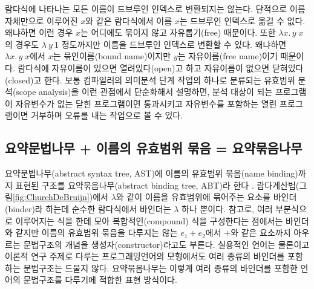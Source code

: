 람다식에 나타나는 모든 이름이 드브루인 인덱스로 변환되지는 않는다.
단적으로 이름 자체만으로 이루어진 $x$와 같은 람다식에서 이름 $x$는
드브루인 인덱스로 옮길 수 없다. 왜냐하면 이런 경우 $x$는 어디에도 묶이지
않고 자유롭기(free) 때문이다. 또한 $\lambda x.\,y\;x$의 경우도 
$\lambda~y~1$ 정도까지만 이름을 드브루인 인덱스로 변환할 수 있다.
왜냐하면 $\lambda x.\,y\;x$에서 $x$는
%
%
묶인이름(bound name)이지만
$y$는
%
%
자유이름(free name)이기 때문이다. 람다식에 자유이름이 있으면
열려있다(open)고 하고 자유이름이 없으면 닫혀있다(closed)고 한다.
보통 컴파일러의 의미분석 단계 작업의 하나로 분류되는
%
%
유효범위 분석(scope analysis)을 이런 관점에서 단순화해서 설명하면,
분석 대상이 되는 프로그램이 자유변수가 없는 닫힌 프로그램이면 통과시키고
자유변수를 포함하는 열린 프로그램이면 거부하며 오류를 내는 작업으로 볼 수 있다.

\subsection{요약문법나무 + 이름의 유효범위 묶음 = 요약묶음나무}
%
%
%
요약문법나무(abstract syntax tree, AST)에
이름의 유효범위 묶음(name binding)까지 표현된 구조를
%
%
%
%
요약묶음나무(abstract binding tree, ABT)라 한다 \cite{PFPL2nd}.
람다계산법(그림\;\ref{fig:ChurchDeBruijn})에서 $\lambda$와 같이
이름을 유효범위에 묶어주는 요소를 바인더(binder)라
하는데 순수한 람다식에서 바인더는 $\lambda$ 하나 뿐이다.
참고로, 여러 부분식으로 이루어지는 식을 한데 모아 복합적인(compound)
식을 구성한다는 점에서는 바인더와 같지만  이름의 유효범위 묶음을
다루지는 않는 $e_1 + e_2$에서 $+$와 같은 요소까지 아우르는 문법구조의
개념을 생성자(constructor)라고도 부른다.
실용적인 언어는 물론이고 이론적 연구 주제로 다루는 프로그래밍언어의
모형에서도 여러 종류의 바인더를 포함하는 문법구조는 드물지 않다.
요약묶음나무는 이렇게 여러 종류의 바인더를 포함한 언어의 문법구조를
다루기에 적합한 표현 방식이다.

